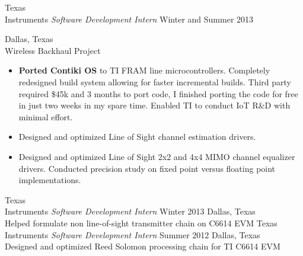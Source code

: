 \documentclass[]{friggeri-cv} %
\begin{document}
\begin{entrylist}
\entry
{Texas \\ Instruments}
{\emph{Software Development Intern}}
{Winter and Summer 2013}
{Dallas, Texas \\ Wireless Backhaul Project
	\begin{itemize}
	\item \textbf{Ported Contiki OS} to TI FRAM line microcontrollers. Completely redesigned build system allowing for faster incremental builds. Third party required \$45k and 3 months to port code, I finished porting the code for free in just two weeks in my spare time. Enabled TI to conduct IoT R\&D with minimal effort.  
	\item Designed and optimized Line of Sight channel estimation drivers.
	\item Designed and optimized Line of Sight 2x2 and 4x4 MIMO channel equalizer drivers. Conducted precision study on fixed point versus floating point implementations.

\end{itemize}}


\entry
{Texas\\  Instruments}
{\emph{Software Development Intern}}
{Winter 2013}
{Dallas, Texas \\
Helped formulate non line-of-sight transmitter chain on C6614 EVM
}
\entry
{Texas \\ Instruments}
{\emph{Software Development Intern}}
{Summer 2012}
{Dallas, Texas \\
Designed and optimized Reed Solomon processing chain for TI C6614 EVM 
}







\end{entrylist}
\end{document}
